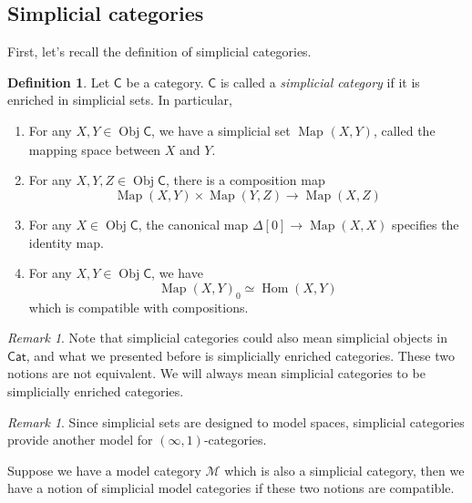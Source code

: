 \documentclass[12pt]{amsart}
\theoremstyle{definition}
\newtheorem{defn}[thm]{Definition}
\theoremstyle{remark}
\newtheorem{rem}[thm]{Remark}
\numberwithin{equation}{section}
\newcommand{\CM}{{\mathcal M}}
\newcommand{\CC}{{\mathsf C}}
\newcommand{\1}{{\mathbb{1}}}
\newcommand{\ob}{\operatorname{Obj}}
\newcommand{\cat}{\mathsf{Cat}}
\newcommand{\Hom}{\operatorname{Hom}}
\newcommand{\map}{\operatorname{Map}}
\begin{document}
\subsection{Simplicial categories}

First, let's recall the definition of simplicial categories.

\begin{defn}
	Let $\CC$ be a category. $\CC$ is called a {\it simplicial category} if it is enriched in simplicial sets. In particular, 
	\begin{enumerate}
		\item For any $X,Y\in \ob \CC$, we have a simplicial set $\map_{}(X,Y)$, called the mapping space between $X$ and $Y$.
		\item For any $X, Y, Z \in \ob \CC$, there is a composition map
		\begin{equation*}
		\map(X,Y) \times \map (Y,Z) \to \map (X,Z)
		\end{equation*}
		\item For any $X\in \ob \CC$, the canonical map $\Delta[0] \to \map(X,X)$ specifies the identity map.
		\item  For any $X,Y\in \ob \CC$, we have
		\begin{equation*}
		 \map(X,Y)_0 \simeq \Hom(X,Y)
		\end{equation*}
		which is compatible with compositions.
	\end{enumerate}
\end{defn}

\begin{rem}
	Note that simplicial categories could also mean simplicial objects in $\cat$, and what we presented before is simplicially enriched categories. These two notions are not equivalent. We will always mean simplicial categories to be simplicially enriched categories.
\end{rem}
\begin{rem}
	Since simplicial sets are designed to model spaces, simplicial categories provide another model for $(\infty,1)$-categories.
\end{rem}

Suppose we have a model category $\CM$ which is also a simplicial category, then we have a notion of simplicial model categories if these two notions are compatible.
\end{document}
